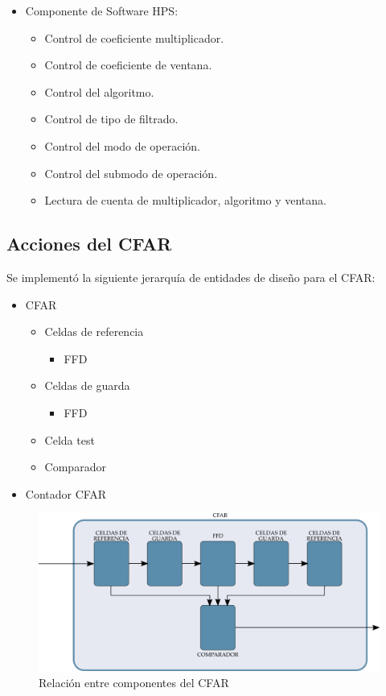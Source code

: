 \begin{itemize}
\begin{itemize}
	\item Componente de Software HPS:
		\begin{itemize}
		\item Control de coeficiente multiplicador.
		\item Control de coeficiente de ventana.
		\item Control del algoritmo.
		\item Control de tipo de filtrado.
		\item Control del modo de operación.
		\item Control del submodo de operación.
		\item Lectura de cuenta de multiplicador, algoritmo y ventana.
		\end{itemize}
		
	\end{itemize}
\end{itemize}

\subsection{Acciones del CFAR}
Se implementó la siguiente jerarquía de entidades de diseño para el CFAR:

\begin{itemize}
\item CFAR
	\begin{itemize}
	\item Celdas de referencia
		\begin{itemize}
		\item FFD
		\end{itemize}
	\item Celdas de guarda
		\begin{itemize}
		\item FFD
		\end{itemize}
	\item Celda test
	\item Comparador
	\end{itemize}

\item Contador CFAR

\end{itemize}



\begin{figure}
\centering
\includegraphics[scale=0.45]{./Figures/cfar_diag_bloques.png}
\caption{Relación entre componentes del CFAR}
\label{diagrama_cfar}
\end{figure}

